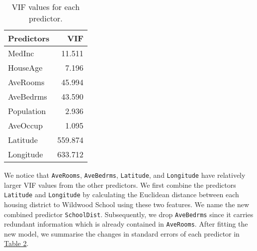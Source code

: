 \documentclass[12pt]{article}
\begin{document}
	\begin{table}[h]
		\centering
		\begin{tabular}{|l|r|}
			\hline
			Predictors & VIF \\[2pt]
			\hline
			MedInc & 11.511 \\[2pt]

			HouseAge & 7.196 \\[2pt]

			AveRooms & 45.994 \\[2pt]

			AveBedrms & 43.590 \\[2pt]

			Population & 2.936 \\[2pt]

			AveOccup & 1.095 \\[2pt]

			Latitude & 559.874 \\[2pt]

			Longitude & 633.712 \\[2pt]
			\hline
		\end{tabular}
		\label{tab:Table1}
		\caption{VIF values for each predictor.}
	\end{table}
	
	We notice that \texttt{AveRooms}, \texttt{AveBedrms}, \texttt{Latitude}, and \texttt{Longitude} have relatively larger VIF values from the other predictors. We first combine the predictors \texttt{Latitude} and \texttt{Longitude} by calculating the Euclidean distance between each housing district to Wildwood School using these two features. We name the new combined predictor \texttt{SchoolDist}. Subsequently, we drop \texttt{AveBedrms} since it carries redundant information which is already contained in \texttt{AveRooms}. After fitting the new model, we summarise the changes in standard errors of each predictor in \hyperref[tab:Table2]{Table 2}.\\
	
\end{document}
